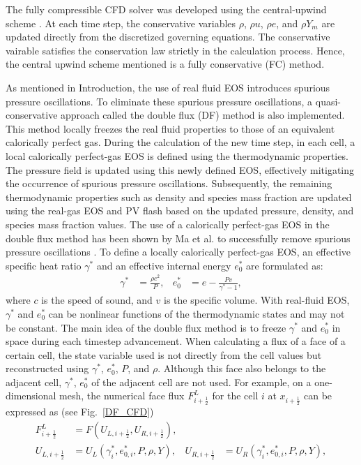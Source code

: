The fully compressible CFD solver was developed using the central-upwind scheme \cite{kurganov2001semidiscrete,greenshields2010implementation}. At each time step, the conservative variables $\rho$, $\rho u$, $\rho e$, and $\rho Y_m$ are updated directly from the discretized governing equations. The conservative vairable satisfies the conservation law strictly in the calculation process. Hence, the central upwind scheme mentioned is a fully conservative (FC) method.

As mentioned in Introduction, the use of real fluid EOS introduces spurious pressure oscillations. To eliminate these spurious pressure oscillations, a quasi-conservative approach called the double flux (DF) method \cite{abgrall2001computations,billet2003adaptive,ma2017entropy} is also implemented.
This method locally freezes the real fluid properties to those of an equivalent calorically perfect gas. During the calculation of the new time step, in each cell, a local calorically perfect-gas EOS is defined using the thermodynamic properties. The pressure field is updated using this newly defined EOS, effectively mitigating the occurrence of spurious pressure oscillations. Subsequently, the remaining thermodynamic properties such as density and species mass fraction are updated using the real-gas EOS and PV flash based on the updated pressure, density, and species mass fraction values. The use of a calorically perfect-gas EOS in the double flux method has been shown by Ma et al. to successfully remove spurious pressure oscillations \cite{ma2017entropy}. To define a locally calorically perfect-gas EOS, an effective specific heat ratio $\gamma^*$ and an effective internal energy $e_0^*$  are formulated as:
\begin{align}
	\gamma^* & = \frac{\rho c^2}{P}, & e_0^* & = e-\frac{Pv}{\gamma^*-1}, \label{eq:IGEOS}
\end{align}
where $c$ is the speed of sound, and $v$ is the specific volume. %
With real-fluid EOS, $\gamma^*$ and $e_0^*$ can be nonlinear functions of the thermodynamic states and may not be constant. The main idea of the double flux method is to freeze $\gamma^*$ and $e_0^*$ in space during each timestep advancement. When calculating a flux of a face of a certain cell, the state variable used is not directly from the cell values but reconstructed using $\gamma^*$, $e_0^*$, $P$, and $\rho$. Although this face also belongs to the adjacent cell, $\gamma^*$, $e_0^*$ of the adjacent cell are not used.  For example, on a one-dimensional mesh, the numerical face flux $F^L_{i+\frac{1}{2}}$ for the cell $i$ at $x_{i+\frac{1}{2}}$ can be expressed as (see Fig.~\ref{DF_CFD})
\begin{align}
	F^L_{i+\frac{1}{2}} & = F\left(U_{L,i+\frac{1}{2}},U_{R,i+\frac{1}{2}}\right),   \\
	U_{L,i+\frac{1}{2}} & = U_L\left(\gamma^*_i,e_{0,i}^*,P,\rho ,Y\right) ,       &
	U_{R,i+\frac{1}{2}} & = U_R\left(\gamma^*_i,e_{0,i}^*,P,\rho ,Y\right),
\end{align}


